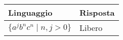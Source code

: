 \documentclass{standalone}
\begin{document}
\begin{tabularx}{\textwidth}{XX}
		Linguaggio & Risposta \\
    \midrule
        \(\{ a^j b^n c^n \mid n, j > 0 \}\)
        &
				Libero
\end{tabularx}
\end{document}
